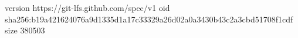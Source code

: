 version https://git-lfs.github.com/spec/v1
oid sha256:b19a421624076a9d1335d1a17c33329a26d02a0a3430b43c2a3cbd51708f1cdf
size 380503
